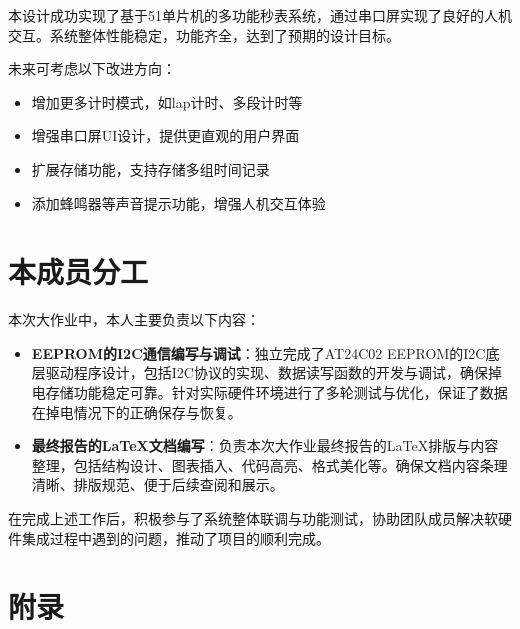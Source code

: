\documentclass[12pt,hyperref,a4paper,UTF8]{ctexart}
\begin{document}
本设计成功实现了基于51单片机的多功能秒表系统，通过串口屏实现了良好的人机交互。系统整体性能稳定，功能齐全，达到了预期的设计目标。

未来可考虑以下改进方向：
\begin{itemize}
  \item 增加更多计时模式，如lap计时、多段计时等
  \item 增强串口屏UI设计，提供更直观的用户界面
  \item 扩展存储功能，支持存储多组时间记录
  \item 添加蜂鸣器等声音提示功能，增强人机交互体验
\end{itemize}

\section{本成员分工}

本次大作业中，本人主要负责以下内容：

\begin{itemize}
  \item \textbf{EEPROM的I2C通信编写与调试}：独立完成了AT24C02 EEPROM的I2C底层驱动程序设计，包括I2C协议的实现、数据读写函数的开发与调试，确保掉电存储功能稳定可靠。针对实际硬件环境进行了多轮测试与优化，保证了数据在掉电情况下的正确保存与恢复。
  \item \textbf{最终报告的\LaTeX{}文档编写}：负责本次大作业最终报告的\LaTeX{}排版与内容整理，包括结构设计、图表插入、代码高亮、格式美化等。确保文档内容条理清晰、排版规范、便于后续查阅和展示。
\end{itemize}

在完成上述工作后，积极参与了系统整体联调与功能测试，协助团队成员解决软硬件集成过程中遇到的问题，推动了项目的顺利完成。
\section*{附录}
\end{document}
